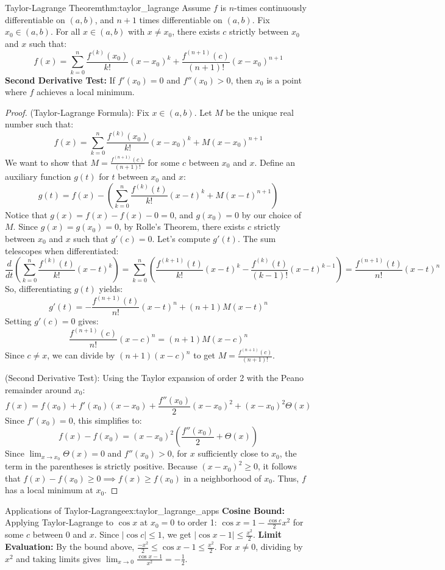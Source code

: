 \documentclass[11pt, a4paper]{article}
\begin{document}
\begin{theorem}{Taylor-Lagrange Theorem}{thm:taylor_lagrange}
Assume $f$ is $n$-times continuously differentiable on $(a,b)$, and $n+1$ times differentiable on $(a,b)$. Fix $x_0 \in (a,b)$. For all $x \in (a,b)$ with $x \neq x_0$, there exists $c$ strictly between $x_0$ and $x$ such that:
$$ f(x) = \sum_{k=0}^{n} \frac{f^{(k)}(x_0)}{k!} (x-x_0)^k + \frac{f^{(n+1)}(c)}{(n+1)!} (x-x_0)^{n+1} $$
\textbf{Second Derivative Test:} If $f'(x_0) = 0$ and $f''(x_0) > 0$, then $x_0$ is a point where $f$ achieves a local minimum.
\end{theorem}
\begin{proof}
(Taylor-Lagrange Formula): Fix $x \in (a,b)$. Let $M$ be the unique real number such that:
$$ f(x) = \sum_{k=0}^n \frac{f^{(k)}(x_0)}{k!}(x-x_0)^k + M(x-x_0)^{n+1} $$
We want to show that $M = \frac{f^{(n+1)}(c)}{(n+1)!}$ for some $c$ between $x_0$ and $x$.
Define an auxiliary function $g(t)$ for $t$ between $x_0$ and $x$:
$$ g(t) = f(x) - \left( \sum_{k=0}^n \frac{f^{(k)}(t)}{k!}(x-t)^k + M(x-t)^{n+1} \right) $$
Notice that $g(x) = f(x) - f(x) - 0 = 0$, and $g(x_0) = 0$ by our choice of $M$.
Since $g(x) = g(x_0) = 0$, by Rolle's Theorem, there exists $c$ strictly between $x_0$ and $x$ such that $g'(c) = 0$.
Let's compute $g'(t)$. The sum telescopes when differentiated:
$$ \frac{d}{dt} \left( \sum_{k=0}^n \frac{f^{(k)}(t)}{k!}(x-t)^k \right) = \sum_{k=0}^n \left( \frac{f^{(k+1)}(t)}{k!}(x-t)^k - \frac{f^{(k)}(t)}{(k-1)!}(x-t)^{k-1} \right) = \frac{f^{(n+1)}(t)}{n!}(x-t)^n $$
So, differentiating $g(t)$ yields:
$$ g'(t) = - \frac{f^{(n+1)}(t)}{n!}(x-t)^n + (n+1)M(x-t)^n $$
Setting $g'(c) = 0$ gives:
$$ \frac{f^{(n+1)}(c)}{n!}(x-c)^n = (n+1)M(x-c)^n $$
Since $c \neq x$, we can divide by $(n+1)(x-c)^n$ to get $M = \frac{f^{(n+1)}(c)}{(n+1)!}$.

(Second Derivative Test): Using the Taylor expansion of order 2 with the Peano remainder around $x_0$:
$$ f(x) = f(x_0) + f'(x_0)(x-x_0) + \frac{f''(x_0)}{2}(x-x_0)^2 + (x-x_0)^2 \Theta(x) $$
Since $f'(x_0) = 0$, this simplifies to:
$$ f(x) - f(x_0) = (x-x_0)^2 \left( \frac{f''(x_0)}{2} + \Theta(x) \right) $$
Since $\lim_{x \to x_0} \Theta(x) = 0$ and $f''(x_0) > 0$, for $x$ sufficiently close to $x_0$, the term in the parentheses is strictly positive.
Because $(x-x_0)^2 \ge 0$, it follows that $f(x) - f(x_0) \ge 0 \implies f(x) \ge f(x_0)$ in a neighborhood of $x_0$. Thus, $f$ has a local minimum at $x_0$.
\end{proof}

\begin{example}{Applications of Taylor-Lagrange}{ex:taylor_lagrange_apps}
\textbf{Cosine Bound:} Applying Taylor-Lagrange to $\cos x$ at $x_0 = 0$ to order 1: $\cos x = 1 - \frac{\cos c}{2} x^2$ for some $c$ between 0 and $x$. Since $|\cos c| \le 1$, we get $|\cos x - 1| \le \frac{x^2}{2}$.
\textbf{Limit Evaluation:} By the bound above, $\frac{-x^2}{2} \le \cos x - 1 \le \frac{x^2}{2}$. For $x \neq 0$, dividing by $x^2$ and taking limits gives $\lim_{x \to 0} \frac{\cos x - 1}{x^2} = -\frac{1}{2}$.
\end{example}
\end{document}
